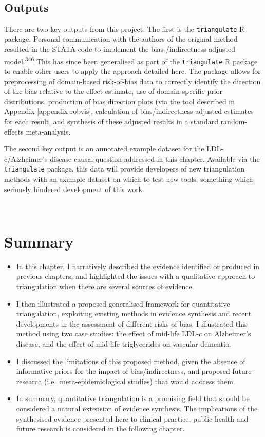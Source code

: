 \documentclass[a4paper, twoside]{templates/ociamthesis}
\begin{document}
~

\hypertarget{tri-software}{%
\subsection{Outputs}\label{tri-software}}

There are two key outputs from this project. The first is the \texttt{triangulate} R package. Personal communication with the authors of the original method resulted in the STATA code to implement the bias-/indirectness-adjusted model.\textsuperscript{\protect\hyperlink{ref-turner2009}{346}} This has since been generalised as part of the \texttt{triangulate} R package to enable other users to apply the approach detailed here. The package allows for preprocessing of domain-based risk-of-bias data to correctly identify the direction of the bias relative to the effect estimate, use of domain-specific prior distributions, production of bias direction plots (via the tool described in Appendix \ref{appendix-robvis}, calculation of bias/indirectness-adjusted estimates for each result, and synthesis of these adjusted results in a standard random-effects meta-analysis.

The second key output is an annotated example dataset for the LDL-c/Alzheimer's disease causal question addressed in this chapter. Available via the \texttt{triangulate} package, this data will provide developers of new triangulation methods with an example dataset on which to test new tools, something which seriously hindered development of this work.

~

\hypertarget{summary-6}{%
\section{Summary}\label{summary-6}}

\begin{itemize}
\item
  In this chapter, I narratively described the evidence identified or produced in previous chapters, and highlighted the issues with a qualitative approach to triangulation when there are several sources of evidence.
\item
  I then illustrated a proposed generalised framework for quantitative triangulation, exploiting existing methods in evidence synthesis and recent developments in the assessment of different risks of bias. I illustrated this method using two case studies: the effect of mid-life LDL-c on Alzheimer's disease, and the effect of mid-life triglycerides on vascular dementia.
\item
  I discussed the limitations of this proposed method, given the absence of informative priors for the impact of bias/indirectness, and proposed future research (i.e.~meta-epidemiological studies) that would address them.
\item
  In summary, quantitative triangulation is a promising field that should be considered a natural extension of evidence synthesis. The implications of the synthesised evidence presented here to clinical practice, public health and future research is considered in the following chapter.
\end{itemize}
\end{document}
